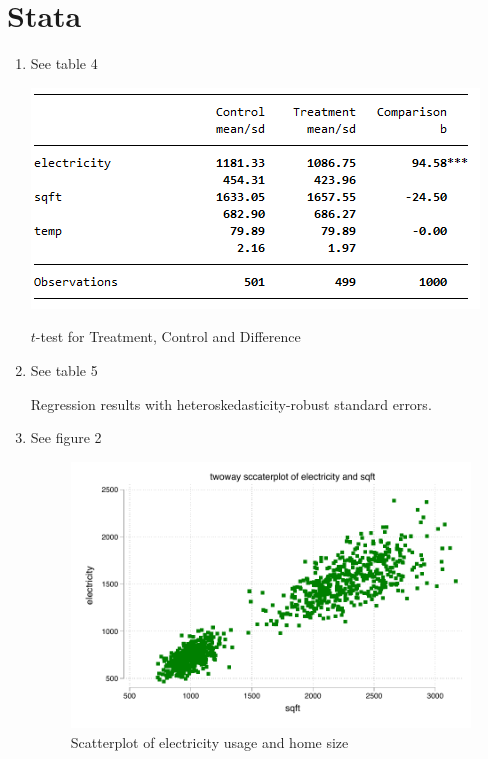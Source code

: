 \documentclass{article}
\begin{document}
\section{Stata}
\begin{enumerate}
    \item 
    
\noindent See table 4
\vspace{0.5cm}
\begin{table}[h]
    \centering
     \includegraphics{HW2Q2.png}
    \caption{\(t\)-test for Treatment, Control and Difference}
    \label{tab:btable_stata}
\end{table}

\item
\noindent See table 5 
\vspace{0.5cm}
\begin{table}[]
    \centering
    
    \caption{Regression results with heteroskedasticity-robust standard errors.}
    \label{tab:question3}
\end{table}

\item
\noindent See figure 2 
\vspace{0.5cm}
\begin{figure}[h]
    \centering
    \includegraphics{HW2Q2.pdf}
    \caption{Scatterplot of electricity usage and home size}
    \label{fig:scatter}
\end{figure}
\end{enumerate}
\
\end{document}
